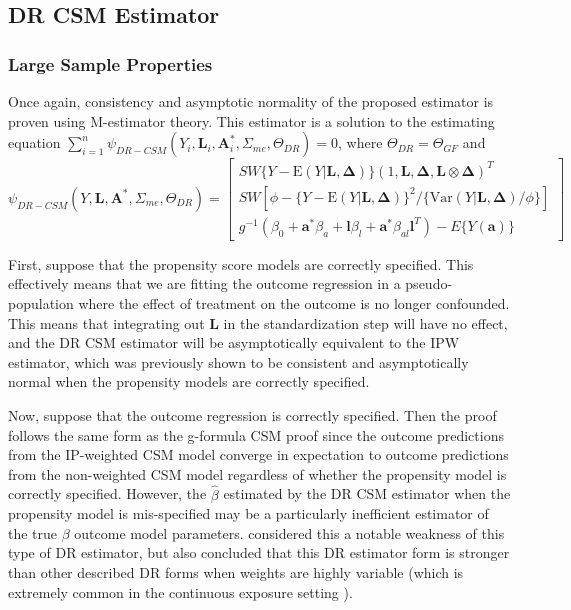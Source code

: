 \documentclass[12pt]{article}
\begin{document}
\subsection{DR CSM Estimator}

\subsubsection{Large Sample Properties}

Once again, consistency and asymptotic normality of the proposed estimator is proven using M-estimator theory. This estimator is a solution to the estimating equation \newline $\sum_{i=1}^{n} \psi_{DR-CSM}(Y_{i}, \bm{L}_{i}, \bm{A}_{i}^{*}, \Sigma_{me}, \Theta_{DR}) = 0$, where $\Theta_{DR} = \Theta_{GF}$ and
\begin{equation*}
    \psi_{DR-CSM}(Y, \bm{L}, \bm{A}^{*}, \Sigma_{me}, \Theta_{DR}) =
    \begin{bmatrix}
       SW\{ Y - \text{E}(Y | \bm{L}, \bm{\Delta}) \} (1, \bm{L}, \bm{\Delta}, \bm{L} \otimes \bm{\Delta})^{T} \\
        SW[\phi - \{ Y - \text{E}(Y | \bm{L}, \bm{\Delta}) \}^{2} / \{ \text{Var}(Y | \bm{L}, \bm{\Delta}) / \phi \}] \\
        g^{-1}(\beta_{0} + \bm{a}^{*}\beta_{a} + \bm{l}\beta_{l} +
        \bm{a}^{*}\beta_{al}\bm{l}^{T}) - E \{ Y(\bm{a}) \}
    \end{bmatrix}
\end{equation*}

First, suppose that the propensity score models are correctly specified. This effectively means that we are fitting the outcome regression in a pseudo-population where the effect of treatment on the outcome is no longer confounded. This means that integrating out $\bm{L}$ in the standardization step will have no effect, and the DR CSM estimator will be asymptotically equivalent to the IPW estimator, which was previously shown to be consistent and asymptotically normal when the propensity models are correctly specified.

Now, suppose that the outcome regression is correctly specified. Then the proof follows the same form as the g-formula CSM proof since the outcome predictions from the IP-weighted CSM model converge in expectation to outcome predictions from the non-weighted CSM model regardless of whether the propensity model is correctly specified. However, the $\hat{\beta}$ estimated by the DR CSM estimator when the propensity model is mis-specified may be a particularly inefficient estimator of the true $\beta$ outcome model parameters. \citet{robins2007} considered this a notable weakness of this type of DR estimator, but also concluded that this DR estimator form is stronger than other described DR forms when weights are highly variable (which is extremely common in the continuous exposure setting \citet{naimi2014}).
\end{document}
